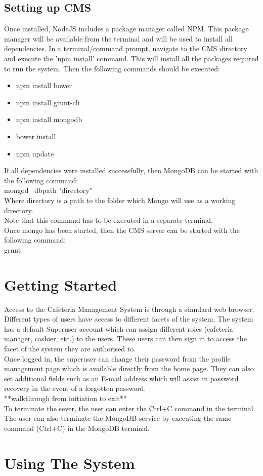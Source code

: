 \documentclass[12pt]{article}
\begin{document}
\subsection{Setting up CMS}
Once installed, NodeJS includes a package manager called NPM. This package manager will be available from the terminal and will be used to install all dependencies. In a terminal/command prompt, navigate to the CMS directory and execute the 'npm install' command. This will install all the packages required to run the system. Then the following commands should be executed:
\begin{itemize}
\item npm install bower
\item npm install grunt-cli
\item npm install mongodb
\item bower install
\item npm update
\end{itemize}

If all dependencies were installed successfully, then MongoDB can be started with the following command:\\
mongod --dbpath "directory"\\
Where directory is a path to the folder which Mongo will use as a working directory.\\
Note that this command has to be executed in a separate terminal.\\
Once mongo has been started, then the CMS server can be started with the following command:\\
grunt

\section{Getting Started}
Access to the Cafeteria Management System is through a standard web browser. Different types of users have access to different facets of the system. The system has a default Superuser account which can assign different roles (cafeteria manager, cashier, etc.) to the users. These users can then sign in to access the facet of the system they are authorised to.\\
Once logged in, the superuser can change their password from the profile management page which is available directly from the home page. They can also set additional fields such as an E-mail address which will assist in password recovery in the event of a forgotten password.\\
**walkthrough from initiation to exit**\\
To terminate the sever, the user can enter the Ctrl+C command in the terminal. The user can also terminate the MongoDB service by executing the same command (Ctrl+C) in the MongoDB terminal.

\section{Using The System} 
\end{document}
